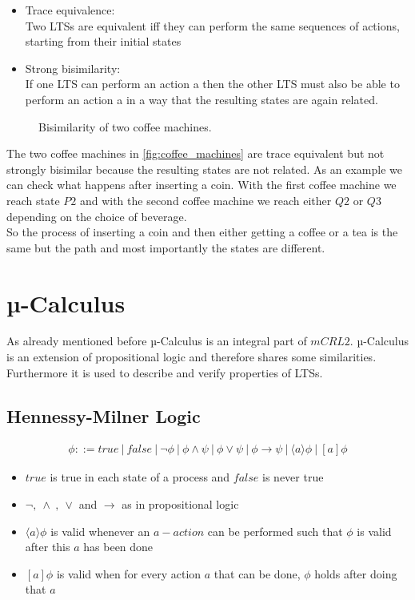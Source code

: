 \documentclass{clseminar}
\begin{document}
  \begin{itemize}[noitemsep]
    \item Trace equivalence: \\
    Two LTSs are equivalent iff they can perform the same sequences of actions, starting from their initial states \\
    \item Strong bisimilarity: \\
    If one LTS can perform an action a then the other LTS must also be able to perform an action a in a way that the resulting states are again related. \\
  \end{itemize}

  \begin{figure}[!ht]
    \resizebox{\textwidth}{!}{}
    \caption{Bisimilarity of two coffee machines.}
    \label{fig:coffee_machines}
  \end{figure}

  The two coffee machines in \autoref{fig:coffee_machines} are trace equivalent but not strongly bisimilar because the resulting states are not related. As an example we can check what happens after inserting a coin. With the first coffee machine we reach state $P2$ and with the second coffee machine we reach either $Q2$ or $Q3$ depending on the choice of beverage.\\
  So the process of inserting a coin and then either getting a coffee or a tea is the same but the path and most importantly the states are different.

  \section{µ-Calculus}
  As already mentioned before µ-Calculus is an integral part of $mCRL2$. µ-Calculus is an extension of propositional logic and therefore shares some similarities. \\
  Furthermore it is used to describe and verify properties of LTSs.

  \subsection{Hennessy-Milner Logic}
  \begin{align*}
    \phi ::= \mathit{true}\ |\ \mathit{false}\ |\ \neg \phi\ |\ \phi \land \psi\ |\ \phi \lor \psi\ |\ \phi \to \psi\ |\ \langle a \rangle \phi \ |\ [a]\phi
  \end{align*}
  \begin{itemize}
    \item $\mathit{true}$ is true in each state of a process and $\mathit{false}$ is never true
    \item $\neg ,\ \land\ ,\ \lor$ and $\to$ as in propositional logic
    \item $\langle a \rangle \phi$ is valid whenever an $a-action$ can be performed such that $\phi$ is valid after this $a$ has been done
    \item $[a]\phi$ is valid when for every action $a$ that can be done, $\phi$ holds after doing that $a$
  \end{itemize}
\end{document}

